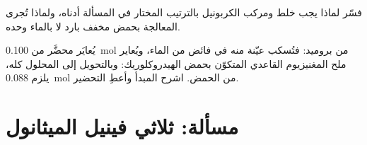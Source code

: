 \begin{exercise}[$\star\star\star$]\label{exo:b1:organomagnesium:11}
فسّر لماذا يجب خلط  ومركب الكربونيل
بالترتيب المختار في المسألة أدناه، ولماذا تُجرى المعالجة
بحمض مخفف بارد لا بالماء وحده.
\end{exercise}

\begin{exercise}[$\star\star\star$]\label{exo:b1:organomagnesium:12}
يُعايَر  محضَّر من \qty{0.100}{mol} من بروميد:
فتُسكب عيّنة منه في فائض من الماء، ويُعاير ملح المغنيزيوم القاعدي
المتكوّن بحمض الهيدروكلوريك: وبالتحويل إلى المحلول كله،
يلزم \qty{0.088}{mol} من الحمض. اشرح المبدأ وأعطِ 
التحضير.
\end{exercise}

\section{مسألة: ثلاثي فينيل الميثانول}


